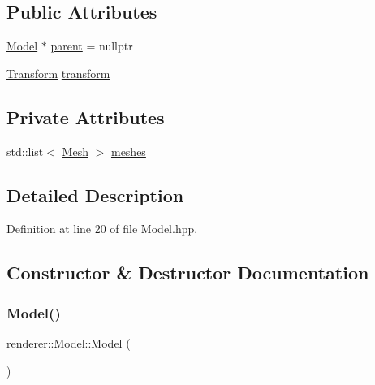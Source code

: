 \subsection*{Public Attributes}
\begin{DoxyCompactItemize}
\item 
\mbox{\hyperlink{classrenderer_1_1_model}{Model}} $\ast$ \mbox{\hyperlink{classrenderer_1_1_model_a49de683276c3c000bea474730008bc7d}{parent}} = nullptr
\item 
\mbox{\hyperlink{structrenderer_1_1_model_1_1_transform}{Transform}} \mbox{\hyperlink{classrenderer_1_1_model_a9689817daed05747058d3b919af724fd}{transform}}
\end{DoxyCompactItemize}
\subsection*{Private Attributes}
\begin{DoxyCompactItemize}
\item 
std\+::list$<$ \mbox{\hyperlink{classrenderer_1_1_mesh}{Mesh}} $>$ \mbox{\hyperlink{classrenderer_1_1_model_abac271da33939950840f9ecf1b17b941}{meshes}}
\end{DoxyCompactItemize}


\subsection{Detailed Description}


Definition at line 20 of file Model.\+hpp.



\subsection{Constructor \& Destructor Documentation}
\mbox{\label{classrenderer_1_1_model_aa34808094210c07af4ab1aba76cf89f6}} 
\subsubsection{\texorpdfstring{Model()}{Model()}}
{\footnotesize\ttfamily renderer\+::\+Model\+::\+Model (\begin{DoxyParamCaption}{ }\end{DoxyParamCaption})\hspace{0.3cm}{\ttfamily [default]}}



